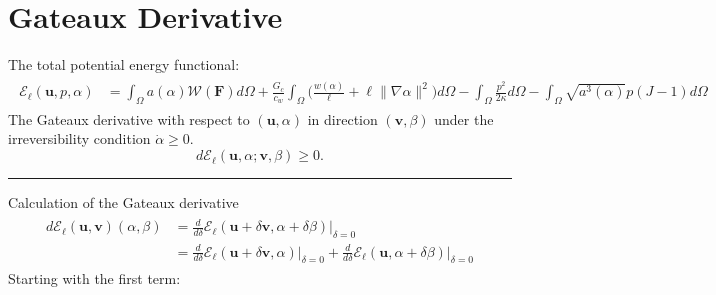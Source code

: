 \documentclass[12pt,3p]{article}
\numberwithin{equation}{section}
\begin{document}
\section{Gateaux Derivative}
The total potential energy functional: 
\begin{align*}
\begin{split}
\mathcal{E}_{\ell}\left(\boldsymbol{u}, p, \alpha\right) &= \int_{\Omega} a(\alpha) \mathcal{W}(\mathbf{F}) d \Omega+\frac{G_{c}}{c_{w}} \int_{\Omega} \bigg(\frac{w(\alpha)}{\ell}+\ell\|\nabla \alpha\|^{2} \bigg) d \Omega- \int_{\Omega} \frac{p^{2}}{2 \kappa} d \Omega - \int_{\Omega} \sqrt{a^{3}(\alpha)} p(J-1) d \Omega 
\end{split}
\end{align*}
The Gateaux derivative with respect to $(\bm{u},\alpha)$ in direction $(\bm{v}, \beta)$ under the irreversibility condition $\dot{\alpha}\ge0$.
\begin{equation}
d\mathcal{E}_\ell \left(\bm{u}, \alpha; \bm{v}, \beta\right) \ge 0.
\end{equation}
\noindent\rule{\linewidth}{0.5pt} %
Calculation of the Gateaux derivative
\begin{align*}
\begin{split}
d\mathcal{E}_\ell (\bm{u}, \bm{v}) (\alpha, \beta) &= \frac{d}{d \delta} \mathcal{E}_\ell (\bm{u} + \delta \bm{v}, \alpha + \delta \beta) \big\rvert_{\delta = 0} \\
	&= \frac{d}{d \delta} \mathcal{E}_\ell (\bm{u} + \delta \bm{v}, \alpha) \big\rvert_{\delta = 0} + \frac{d}{d \delta} \mathcal{E}_\ell (\bm{u}, \alpha + \delta \beta) \big\rvert_{\delta = 0}
\end{split}
\end{align*}
Starting with the first term: 
\end{document}
